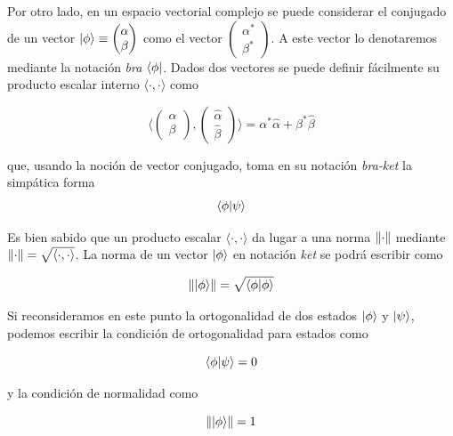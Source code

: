 \documentclass[11pt, spanish]{report}
\numberwithin{equation}{section}
\numberwithin{defin}{section}
\begin{document}
Por otro lado, en un espacio vectorial complejo se puede considerar el conjugado de un vector $\ket{\phi}\equiv \begin{pmatrix}\alpha \\ \beta \end{pmatrix}$ como el vector $\begin{pmatrix}\alpha^* \\ \beta^* \end{pmatrix}$. A este vector lo denotaremos mediante la notación \textit{bra} $\bra{\phi}$. Dados dos vectores se puede definir fácilmente su producto escalar interno $\langle\cdot,\cdot\rangle$ como 

\begin{equation}
\langle\begin{pmatrix}\alpha \\ \beta \end{pmatrix},\begin{pmatrix}\hat{\alpha} \\ \hat{\beta} \end{pmatrix}\rangle=\alpha^*\hat{\alpha}+\beta^*\hat{\beta}
\end{equation}

\noindent que, usando la noción de vector conjugado, toma en su notación \textit{bra-ket} la simpática forma 
\begin{equation}
\bra{\phi}\ket{\psi}
\end{equation}

Es bien sabido que un producto escalar $\langle\cdot,\cdot\rangle$ da lugar a una norma $\norm{\cdot}$ mediante $\norm{\cdot}=\sqrt{\langle\cdot,\cdot\rangle}$. La norma de un vector $\ket{\phi}$ en notación \textit{ket} se podrá escribir como

\begin{equation}
\norm{\ket{\phi}}=\sqrt{\bra{\phi}\ket{\phi}}
\end{equation}

Si reconsideramos en este punto la ortogonalidad de dos estados $\ket{\phi}$ y $\ket{\psi}$, podemos escribir la condición de ortogonalidad para estados como 

\begin{equation}
\bra{\phi}\ket{\psi}=0
\end{equation}

\noindent y la condición de normalidad como

\begin{equation}
\norm{\ket{\phi}}=1
\end{equation}
\end{document}
